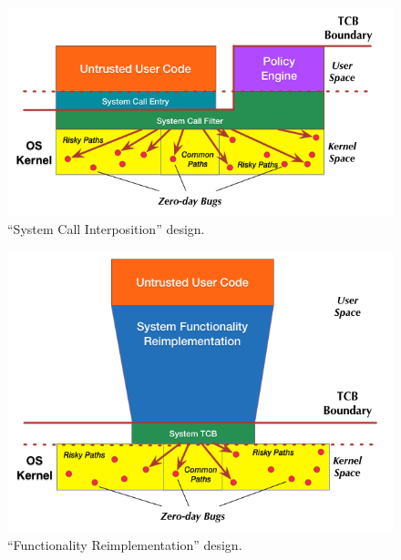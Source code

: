 {\begin{figure}%
\centering
\includegraphics[width=1.0\columnwidth]{diagram/Virtualization_Design_Model_03.png}
\caption{\small ``System Call Interposition'' design.}
\label{fig:design_system_call_interposition}
\end{figure}

\begin{figure}%
\centering
\includegraphics[width=1.0\columnwidth]{diagram/Virtualization_Design_Model_02.png}
\caption{\small ``Functionality Reimplementation'' design.}
\label{fig:design_functionality_reimplementation}
\end{figure}

}
